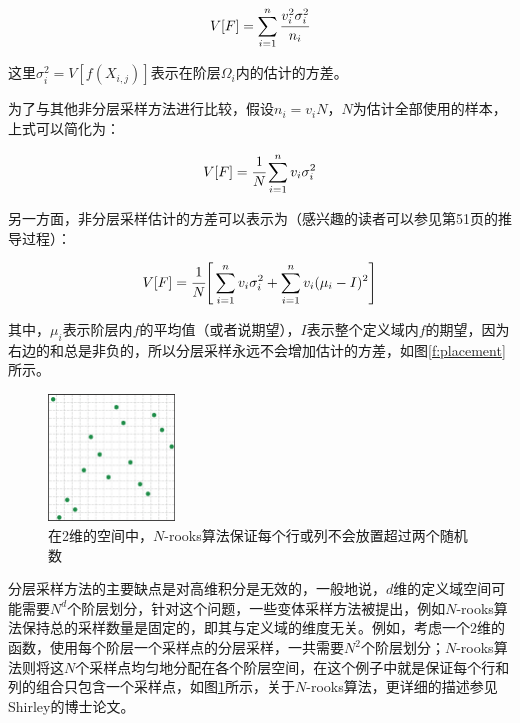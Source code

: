 \begin{equation}
	V[F]=\sum_{i=1}^{n} \cfrac{v_{i}^2 \sigma_{i}^2}{n_i}
\end{equation}

\noindent 这里$\sigma_{i}^2=V[f(X_{i,j})]$表示在阶层$\Omega_i$内的估计的方差。

为了与其他非分层采样方法进行比较，假设$n_i=v_iN$，$N$为估计全部使用的样本，上式可以简化为：

\begin{equation}
	V[F]= \cfrac{1}{N}\sum_{i=1}^{n}v_{i} \sigma_{i}^2
\end{equation}

另一方面，非分层采样估计的方差可以表示为（感兴趣的读者可以参见\cite{a:RobustMonteCarloMethodsforLightTransportSimulation}第51页的推导过程）：

\begin{equation}
	V[F]= \cfrac{1}{N}\Bigg[ \sum_{i=1}^{n}v_{i} \sigma_{i}^2 +\sum_{i=1}^{n}v_i(\mu_i-I)^2   \Bigg]
\end{equation}

\noindent 其中，$\mu_i$表示阶层内$f$的平均值（或者说期望），$I$表示整个定义域内$f$的期望，因为右边的和总是非负的，所以分层采样永远不会增加估计的方差，如图\ref{f:placement}所示。

\begin{figure}
\sidecaption
	\includegraphics[width=0.3\textwidth]{figures/mc/mc-12-3}
	\caption{在2维的空间中，$N$-rooks算法保证每个行或列不会放置超过两个随机数}
	\label{f:n-rooks}
\end{figure}

分层采样方法的主要缺点是对高维积分是无效的，一般地说，$d$维的定义域空间可能需要$N^d$个阶层划分，针对这个问题，一些变体采样方法被提出，例如$N$-rooks算法保持总的采样数量是固定的，即其与定义域的维度无关。例如，考虑一个2维的函数，使用每个阶层一个采样点的分层采样，一共需要$N^2$个阶层划分；$N$-rooks算法则将这$N$个采样点均匀地分配在各个阶层空间，在这个例子中就是保证每个行和列的组合只包含一个采样点，如图\ref{f:n-rooks}所示，关于$N$-rooks算法，更详细的描述参见Shirley的博士论文\cite{a:PhysicallyBasedLightingCalculationsForComputerGraphics}。

